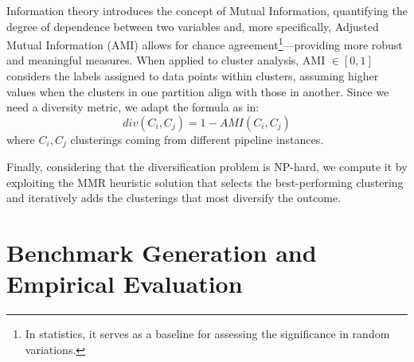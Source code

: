 Information theory introduces the concept of Mutual Information, quantifying the degree of dependence between two variables and, more specifically, Adjusted Mutual Information (AMI) allows for chance agreement\footnote{In statistics, it serves as a baseline for assessing the significance in random variations.}---providing more robust and meaningful measures.
When applied to cluster analysis, AMI $\in [0, 1]$ considers the labels assigned to data points within clusters, assuming higher values when the clusters in one partition align with those in another.
Since we need a diversity metric, we adapt the formula as in:
$$div(C_i, C_j) = 1- AMI(C_i, C_j)$$ 
where $C_i, C_j$ clusterings coming from different pipeline instances.

Finally, considering that the diversification problem is NP-hard, we compute it by exploiting the MMR heuristic solution \cite{vieira2011query} that selects the best-performing clustering and iteratively adds the clusterings that most diversify the outcome.

\section{Benchmark Generation and Empirical Evaluation}\label{clustering-sec:test}


